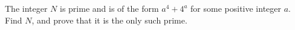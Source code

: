 The integer $N$ is prime and is of the form $a^4+4^a$ for some positive integer $a$. Find $N$, and prove that it is the only such prime.
